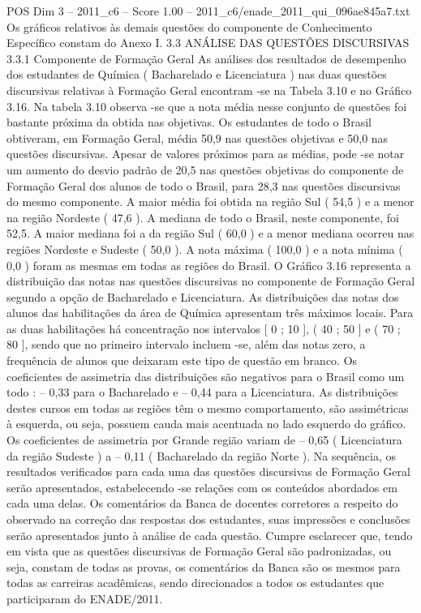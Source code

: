 \begin{textsample}{POS Dim 3 – 2011\_c6 – Score 1.00 – 2011\_c6/enade\_2011\_qui\_096ae845a7.txt}
Os gráficos relativos às demais questões do componente de Conhecimento Específico constam do Anexo I. 3.3 ANÁLISE DAS QUESTÕES DISCURSIVAS 3.3.1 Componente de Formação Geral As análises dos resultados de desempenho dos estudantes de Química ( Bacharelado e Licenciatura ) nas duas questões discursivas relativas à Formação Geral encontram -se na Tabela 3.10 e no Gráfico 3.16.
Na tabela 3.10 observa -se que a nota média nesse conjunto de questões foi bastante próxima da obtida nas objetivas.
Os estudantes de todo o Brasil obtiveram, em Formação Geral, média 50,9 nas questões objetivas e 50,0 nas questões discursivas.
Apesar de valores próximos para as médias, pode -se notar um aumento do desvio padrão de 20,5 nas questões objetivas do componente de Formação Geral dos alunos de todo o Brasil, para 28,3 nas questões discursivas do mesmo componente.
A maior média foi obtida na região Sul ( 54,5 ) e a menor na região Nordeste ( 47,6 ).
A mediana de todo o Brasil, neste componente, foi 52,5.
A maior mediana foi a da região Sul ( 60,0 ) e a menor mediana ocorreu nas regiões Nordeste e Sudeste ( 50,0 ).
A nota máxima ( 100,0 ) e a nota mínima ( 0,0 ) foram as mesmas em todas as regiões do Brasil.
O Gráfico 3.16 representa a distribuição das notas nas questões discursivas no componente de Formação Geral segundo a opção de Bacharelado e Licenciatura.
As distribuições das notas dos alunos das habilitações da área de Química apresentam três máximos locais.
Para as duas habilitações há concentração nos intervalos [ 0 ; 10 ], ( 40 ; 50 ] e ( 70 ; 80 ], sendo que no primeiro intervalo incluem -se, além das notas zero, a frequência de alunos que deixaram este tipo de questão em branco.
Os coeficientes de assimetria das distribuições são negativos para o Brasil como um todo : – 0,33 para o Bacharelado e – 0,44 para a Licenciatura.
As distribuições destes cursos em todas as regiões têm o mesmo comportamento, são assimétricas à esquerda, ou seja, possuem cauda mais acentuada no lado esquerdo do gráfico.
Os coeficientes de assimetria por Grande região variam de – 0,65 ( Licenciatura da região Sudeste ) a – 0,11 ( Bacharelado da região Norte ).
Na sequência, os resultados verificados para cada uma das questões discursivas de Formação Geral serão apresentados, estabelecendo -se relações com os conteúdos abordados em cada uma delas.
Os comentários da Banca de docentes corretores a respeito do observado na correção das respostas dos estudantes, suas impressões e conclusões serão apresentados junto à análise de cada questão.
Cumpre esclarecer que, tendo em vista que as questões discursivas de Formação Geral são padronizadas, ou seja, constam de todas as provas, os comentários da Banca são os mesmos para todas as carreiras acadêmicas, sendo direcionados a todos os estudantes que participaram do ENADE/2011.

\end{textsample}

